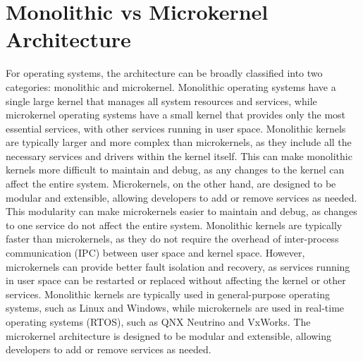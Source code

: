 \documentclass{article}
\begin{document}
\section{Monolithic vs Microkernel Architecture}
\label{sec:monolithic-vs-microkernel}

For operating systems, the architecture can be broadly classified into two categories: monolithic and microkernel.
Monolithic operating systems have a single large kernel that manages all system resources and services, while microkernel operating systems have a small kernel that provides only the most essential services, with other services running in user space.
Monolithic kernels are typically larger and more complex than microkernels, as they include all the necessary services and drivers within the kernel itself.
This can make monolithic kernels more difficult to maintain and debug, as any changes to the kernel can affect the entire system.
Microkernels, on the other hand, are designed to be modular and extensible, allowing developers to add or remove services as needed.
This modularity can make microkernels easier to maintain and debug, as changes to one service do not affect the entire system.
Monolithic kernels are typically faster than microkernels, as they do not require the overhead of inter-process communication (IPC) between user space and kernel space.
However, microkernels can provide better fault isolation and recovery, as services running in user space can be restarted or replaced without affecting the kernel or other services.
Monolithic kernels are typically used in general-purpose operating systems, such as Linux and Windows, while microkernels are used in real-time operating systems (RTOS), such as QNX Neutrino and VxWorks.
The microkernel architecture is designed to be modular and extensible, allowing developers to add or remove services as needed.
\end{document}
